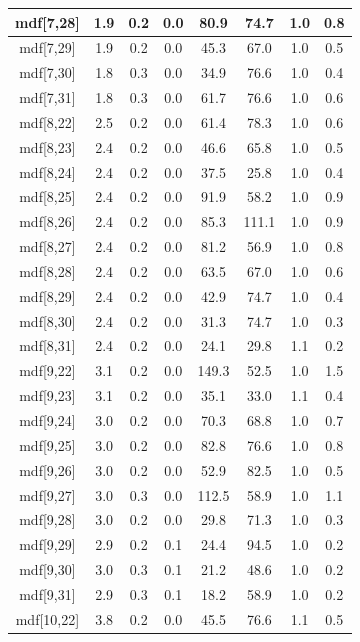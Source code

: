\begin{longtable}{|c|c|c|c|c|c|c|c|}
\hline
mdf[7,28] & 1.9 & 0.2 & 0.0 & 80.9 & 74.7 & 1.0 & 0.8 \\
\hline
mdf[7,29] & 1.9 & 0.2 & 0.0 & 45.3 & 67.0 & 1.0 & 0.5 \\
\hline
mdf[7,30] & 1.8 & 0.3 & 0.0 & 34.9 & 76.6 & 1.0 & 0.4 \\
\hline
mdf[7,31] & 1.8 & 0.3 & 0.0 & 61.7 & 76.6 & 1.0 & 0.6 \\
\hline
mdf[8,22] & 2.5 & 0.2 & 0.0 & 61.4 & 78.3 & 1.0 & 0.6 \\
\hline
mdf[8,23] & 2.4 & 0.2 & 0.0 & 46.6 & 65.8 & 1.0 & 0.5 \\
\hline
mdf[8,24] & 2.4 & 0.2 & 0.0 & 37.5 & 25.8 & 1.0 & 0.4 \\
\hline
mdf[8,25] & 2.4 & 0.2 & 0.0 & 91.9 & 58.2 & 1.0 & 0.9 \\
\hline
mdf[8,26] & 2.4 & 0.2 & 0.0 & 85.3 & 111.1 & 1.0 & 0.9 \\
\hline
mdf[8,27] & 2.4 & 0.2 & 0.0 & 81.2 & 56.9 & 1.0 & 0.8 \\
\hline
mdf[8,28] & 2.4 & 0.2 & 0.0 & 63.5 & 67.0 & 1.0 & 0.6 \\
\hline
mdf[8,29] & 2.4 & 0.2 & 0.0 & 42.9 & 74.7 & 1.0 & 0.4 \\
\hline
mdf[8,30] & 2.4 & 0.2 & 0.0 & 31.3 & 74.7 & 1.0 & 0.3 \\
\hline
mdf[8,31] & 2.4 & 0.2 & 0.0 & 24.1 & 29.8 & 1.1 & 0.2 \\
\hline
mdf[9,22] & 3.1 & 0.2 & 0.0 & 149.3 & 52.5 & 1.0 & 1.5 \\
\hline
mdf[9,23] & 3.1 & 0.2 & 0.0 & 35.1 & 33.0 & 1.1 & 0.4 \\
\hline
mdf[9,24] & 3.0 & 0.2 & 0.0 & 70.3 & 68.8 & 1.0 & 0.7 \\
\hline
mdf[9,25] & 3.0 & 0.2 & 0.0 & 82.8 & 76.6 & 1.0 & 0.8 \\
\hline
mdf[9,26] & 3.0 & 0.2 & 0.0 & 52.9 & 82.5 & 1.0 & 0.5 \\
\hline
mdf[9,27] & 3.0 & 0.3 & 0.0 & 112.5 & 58.9 & 1.0 & 1.1 \\
\hline
mdf[9,28] & 3.0 & 0.2 & 0.0 & 29.8 & 71.3 & 1.0 & 0.3 \\
\hline
mdf[9,29] & 2.9 & 0.2 & 0.1 & 24.4 & 94.5 & 1.0 & 0.2 \\
\hline
mdf[9,30] & 3.0 & 0.3 & 0.1 & 21.2 & 48.6 & 1.0 & 0.2 \\
\hline
mdf[9,31] & 2.9 & 0.3 & 0.1 & 18.2 & 58.9 & 1.0 & 0.2 \\
\hline
mdf[10,22] & 3.8 & 0.2 & 0.0 & 45.5 & 76.6 & 1.1 & 0.5 \\

\end{longtable}
